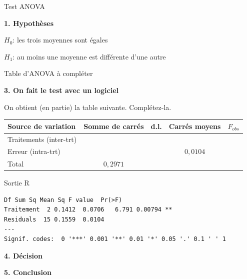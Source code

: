 \documentclass{BeamerTemplate}
\begin{document}
\begin{frame}[t]{Test ANOVA}

\textbf{1. Hypothèses}

$H_0$: les trois moyennes sont égales

$H_1$: au moins une moyenne est différente d'une autre

\bigskip
{}

\end{frame}

\begin{frame}[t]{Table d'ANOVA à compléter}

\textbf{3. On fait le test avec un logiciel}

\medskip
On obtient (en partie) la table suivante. Complétez-la.

\vspace{3mm}
\begin{center}
\renewcommand{\arraystretch}{1.8}
\begin{tabular}{lcccc}
\toprule
Source de variation & Somme de carrés & d.l. & Carrés moyens & $F_{obs}$\\
\midrule
Traitements (inter-trt) & \hspace{1.5cm} & \hspace{1cm} & \hspace{2cm} & \hspace{1cm}\\
Erreur (intra-trt)     &          &        & $0{,}0104$ & \\
\midrule
Total                  & $0{,}2971$ &      &            & \\
\bottomrule
\end{tabular}
\end{center}

\end{frame}

\begin{frame}[fragile,t]{Sortie R}

\begin{Verbatim}[fontsize=\small]
           Df Sum Sq Mean Sq F value  Pr(>F)
Traitement  2 0.1412  0.0706   6.791 0.00794 **
Residuals  15 0.1559  0.0104
---
Signif. codes:  0 '***' 0.001 '**' 0.01 '*' 0.05 '.' 0.1 ' ' 1
\end{Verbatim}

\bigskip
\textbf{4. Décision}
\vspace{1.5cm}

\textbf{5. Conclusion}
\vspace{1.5cm}

\end{frame}
\end{document}
